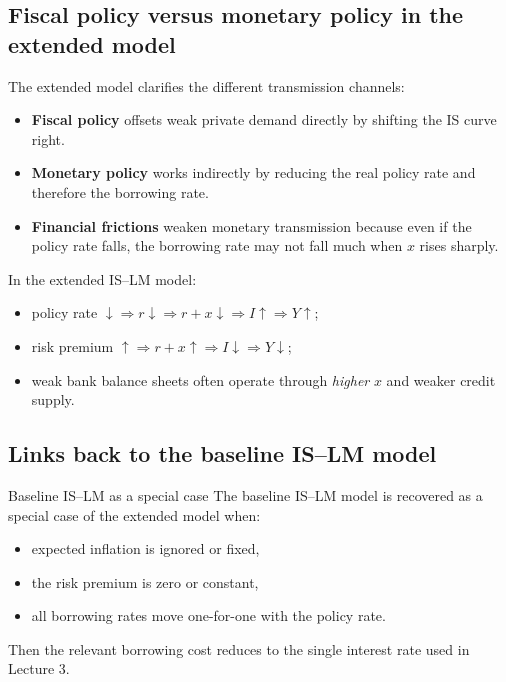 \subsection{Fiscal policy versus monetary policy in the extended model}

The extended model clarifies the different transmission channels:
\begin{itemize}[leftmargin=1.5em]
    \item \textbf{Fiscal policy} offsets weak private demand directly by shifting the IS curve right.
    \item \textbf{Monetary policy} works indirectly by reducing the real policy rate and therefore the borrowing rate.
    \item \textbf{Financial frictions} weaken monetary transmission because even if the policy rate falls, the borrowing rate may not fall much when $x$ rises sharply.
\end{itemize}

\begin{examtip}[title={Exam Focus: Transmission channels}]
In the extended IS--LM model:
\begin{itemize}[leftmargin=1.5em]
    \item policy rate $\downarrow \Rightarrow r\downarrow \Rightarrow r+x\downarrow \Rightarrow I\uparrow \Rightarrow Y\uparrow$;
    \item risk premium $\uparrow \Rightarrow r+x\uparrow \Rightarrow I\downarrow \Rightarrow Y\downarrow$;
    \item weak bank balance sheets often operate through \emph{higher} $x$ and weaker credit supply.
\end{itemize}
\end{examtip}

\subsection{Links back to the baseline IS--LM model}

\begin{theorem}{Baseline IS--LM as a special case}{}
The baseline IS--LM model is recovered as a special case of the extended model when:
\begin{itemize}[leftmargin=1.5em]
    \item expected inflation is ignored or fixed,
    \item the risk premium is zero or constant,
    \item all borrowing rates move one-for-one with the policy rate.
\end{itemize}
Then the relevant borrowing cost reduces to the single interest rate used in Lecture 3.
\end{theorem}


